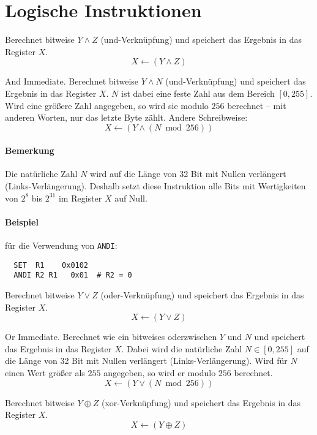\section{Logische Instruktionen}

Berechnet bitweise $Y \land Z$ (und-Verknüpfung) und speichert das Ergebnis in
das Register $X$.
\[
    X \gets (Y \land Z)
\]


\glqq And Immediate\grqq.
Berechnet bitweise $Y \land N$ (und-Verknüpfung) und speichert das Ergebnis in
das Register $X$. $N$ ist dabei eine feste Zahl aus dem Bereich $[0, 255]$.
Wird eine größere Zahl angegeben, so wird sie modulo $256$ berechnet -- mit
anderen Worten, nur das letzte Byte zählt.
Andere Schreibweise:
\[
    X \gets (Y \land (N \bmod 256))
\]
\paragraph{Bemerkung}
Die natürliche Zahl $N$ wird auf die Länge von 32 Bit mit Nullen verlängert
(Links-Verlängerung).
Deshalb setzt diese Instruktion alle Bits mit Wertigkeiten von $2^{8}$ bis
$2^{31}$ im Register $X$ auf Null.

\paragraph{Beispiel}
für die Verwendung von \texttt{ANDI}:
\begin{lstlisting}
  SET  R1    0x0102
  ANDI R2 R1   0x01  # R2 = 0
\end{lstlisting}



Berechnet bitweise $Y \lor Z$ (oder-Verknüpfung) und speichert das Ergebnis
in das Register $X$.
\[
    X \gets (Y \lor Z)
\]


\glqq Or Immediate\grqq.
Berechnet wie  ein bitweises \glqq oder\grqq zwischen $Y$ und $N$ und
speichert das Ergebnis in das Register $X$. Dabei wird die natürliche Zahl 
$N \in [0, 255]$ auf die Länge von 32 Bit mit Nullen verlängert
(Links-Verlängerung).
Wird für $N$ einen Wert größer als $255$ angegeben, so wird er modulo $256$
berechnet.
\[
    X \gets (Y \lor (N \bmod 256))
\]


Berechnet bitweise $Y \oplus Z$ (xor-Verknüpfung) und speichert das Ergebnis in
das Register $X$.
\[
    X \gets (Y \oplus Z)
\]


